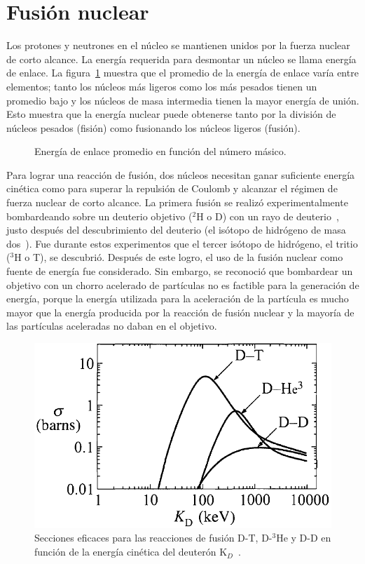 \section{Fusión nuclear}
Los protones y neutrones en el núcleo se mantienen unidos por la fuerza nuclear de corto alcance. La energía
requerida para desmontar un núcleo se llama energía de enlace. La figura~\ref{fig:nucleons} muestra que el promedio
de la energía de enlace varía entre elementos; tanto los núcleos más ligeros como los más pesados tienen un promedio bajo
y los núcleos de masa intermedia tienen la mayor energía de unión.
Esto muestra que la energía nuclear puede obtenerse tanto por la división de núcleos pesados (fisión) como 
fusionando los núcleos ligeros (fusión).\par
\begin{figure}
    \centering
    \def\svgwidth{10cm}
    
    \caption[Energía de enlace]{Energía de enlace promedio en función del número másico.}
    \label{fig:nucleons}
\end{figure}
Para lograr una reacción de fusión, dos núcleos necesitan ganar suficiente energía cinética como para superar
la repulsión de Coulomb y alcanzar el régimen de fuerza nuclear de corto alcance. La primera fusión 
se realizó experimentalmente bombardeando sobre un deuterio
objetivo ($^2$H o D) con un rayo de deuterio~\cite{Oliphant1934}, justo después del descubrimiento del deuterio (el isótopo de hidrógeno de masa dos~\cite{PhysRev.40.1}).
Fue durante estos experimentos que el tercer isótopo de hidrógeno, el tritio ($^3$H o T),
se descubrió. Después de este logro, el uso de la fusión nuclear como fuente de energía fue
considerado. Sin embargo, se reconoció que bombardear un objetivo con un chorro acelerado de partículas 
no es factible para la generación de energía, porque la energía utilizada para la aceleración de la partícula
es mucho mayor que la energía producida por la reacción de fusión nuclear y la mayoría de
las partículas aceleradas no daban en el objetivo.\par
\begin{figure}
    \centering
    \includegraphics[scale=0.5]{img/fusion.png}
    \caption[Secciones eficaces en reacciones de fusión]{Secciones eficaces para las reacciones de fusión D-T, D-$^3$He y D-D en función de la energía cinética del deuterón K$_D$~\cite{Freidberg:1186225}.}
    \label{fig:fusion}
\end{figure}
